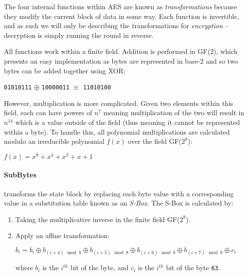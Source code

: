     The four internal functions within AES are known as \emph{transformations} because they modify the current block of data in some way. Each function is invertible, and as such we will only be describing the transformations for \emph{encryption} -- decryption is simply running the round in reverse.
    
    All functions work within a finite field. Addition is performed in GF($2$), which presents an easy implementation as bytes are represented in base-2 and so two bytes can be added together using XOR\cite{Gladman:2007aa}:
    
    \begin{center}
      \verb!01010111! $\oplus$ \verb!10000011! $\equiv$ \verb!11010100!
    \end{center}
    
    However, multiplication is more complicated. Given two elements within this field, each can have powers of $n^7$ meaning multiplication of the two will result in $n^{14}$ which is a value outside of the field (thus meaning it cannot be represented within a byte). To handle this, all polynomial multiplications are calculated modulo an irreducible polynomial $f(x)$ over the field GF($2^8$):
    
    \begin{center}
      $f(x) = x^8 + x^4 + x^3 + x + 1$
    \end{center}
    
    \paragraph{SubBytes}
    
    transforms the state block by replacing each byte value with a corresponding value in a substitution table known as an \emph{S-Box}. The S-Box is calculated by\cite{Standards:2001aa}:
    
    \begin{enumerate}
      \item Taking the multiplicative inverse in the finite field GF($2^8$).
      \item Apply an affine transformation:
        \begin{center}
          $b_i = b_i \oplus b_{(i+4) \mod 8} \oplus b_{(i+5) \mod 8} \oplus b_{(i+6) \mod 8} \oplus b_{(i+7) \mod 8} \oplus c_i$
        \end{center}
        
        where $b_i$ is the $i^{th}$ bit of the byte, and $c_i$ is the $i^{th}$ bit of the byte \verb!63!.
    \end{enumerate}
    
